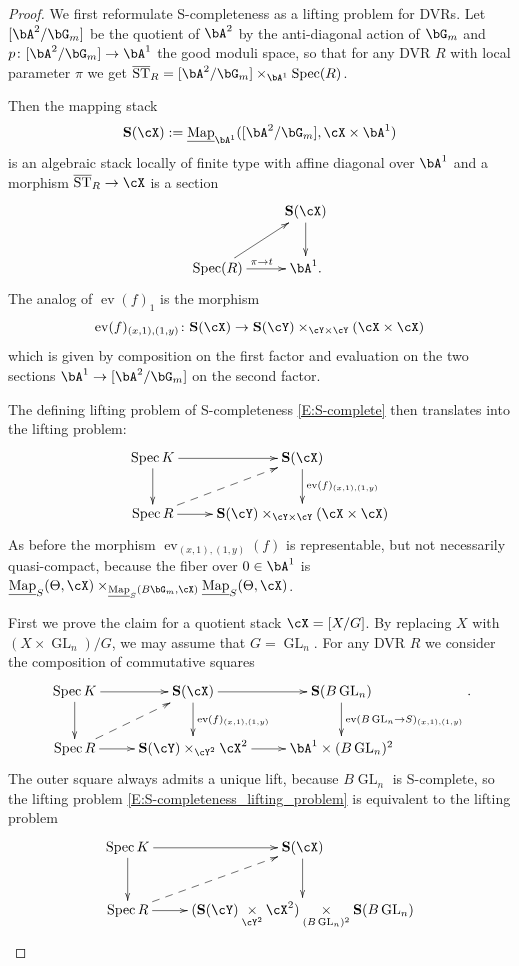 \documentclass[a4paper]{amsart}
\numberwithin{equation}{section}
\theoremstyle{plain}
\theoremstyle{definition}
\DeclareMathOperator{\Spec}{Spec}
\DeclareMathOperator{\ST}{ST}
\DeclareMathOperator{\GL}{GL}
\DeclareMathOperator{\ev}{ev}
\newcommand{\uMap}{\underline{{\rm Map}}}
\def\oST{\overline{\ST}}
\begin{document}
\begin{proof}
We first reformulate {\textsf{S}}-completeness as a lifting problem for DVRs. Let $[\bA^2/\bG_m]$ be the quotient of $\bA^2$ by the anti-diagonal action of $\bG_m$ and $p\colon [\bA^2/\bG_m]\to \bA^1$ the good moduli space, so that for any DVR $R$ with local parameter $\pi$ we get $\oST_R= [\bA^2/\bG_m] \times_{\bA^1} \Spec(R)$.

Then the mapping stack $$\mathbf{S}(\cX):=\uMap_{\bA^1}([\bA^2/\bG_m],\cX \times \bA^1)$$is an algebraic stack locally of finite type with affine diagonal \cite[Thm. 14.9]{ahr2} over $\bA^1$ and a morphism $\oST_R \to \cX$ is a section
$$\xymatrix{ & \mathbf{S}(\cX) \ar[d]\\ %
	\Spec(R) \ar[r]^{\pi \to t}\ar[ur] & \bA^1.}$$
The analog of $\ev(f)_1$ is the morphism 
$$\ev(f)_{(x,1),(1,y)} \colon \mathbf{S}(\cX) \to \mathbf{S}(\cY) \times_{\cY \times \cY} (\cX \times \cX)$$
which is given by composition on the first factor and evaluation on the two sections $\bA^1 \to [\bA^2/\bG_m]$ on the second factor.

The defining lifting problem of \textsf{S}-completeness \eqref{E:S-complete} then translates into the lifting problem:
\begin{equation}\label{E:S-completeness_lifting_problem}
\xymatrix{
	\Spec K \ar[d] \ar[r] &  \mathbf{S}(\cX) \ar[d]^{\ev(f)_{(x,1),(1,y)}} \\ 
	\Spec R \ar[r]\ar@{-->}[ur]  & \mathbf{S}(\cY) \times_{\cY \times \cY} (\cX \times \cX)
}
\end{equation}
As before the morphism $\ev_{(x,1),(1,y)}(f)$ is representable, but not necessarily quasi-compact, because the fiber over $0\in \bA^1$ is $\uMap_S(\Theta,\cX) \times_{\uMap_S(B\bG_m,\cX)} \uMap_S(\Theta,\cX)$.

First we prove the claim for a quotient stack $\cX = [X/G]$. By replacing $X$ with $(X \times \GL_n) / G$, we may assume that $G = \GL_n$. For any DVR $R$ we consider the composition of commutative squares
$$\xymatrix{
	\Spec K \ar[d] \ar[r] &  \mathbf{S}(\cX) \ar[d]^{\ev(f)_{(x,1),(1,y)}} \ar[r] &  \mathbf{S}(B\GL_n) \ar[d]^{\ev(B\GL_n \to S)_{(x,1),(1,y)}} \\ 
	\Spec R \ar[r]\ar@{-->}[ur]  & \mathbf{S}(\cY) \times_{\cY^2} \cX^2 \ar[r] & \bA^1 \times (B\GL_n)^2
}.$$
The outer square always admits a unique lift, because $B\GL_n$ is {\textsf{S}}-complete, so the lifting problem \eqref{E:S-completeness_lifting_problem} is equivalent to the lifting problem
\begin{equation} \label{E:S-completeness_lifting_problem_2}
\xymatrix{
	\Spec K \ar[d] \ar[r] &  \mathbf{S}(\cX) \ar[d] \\ 
	\Spec R \ar[r]\ar@{-->}[ur]  & (\mathbf{S}(\cY) \underset{\cY^2}{\times} \cX^2) \underset{(B\GL_n)^2}{\times}  \mathbf{S}(B\GL_n) }
\end{equation}


\end{proof}
\end{document}
